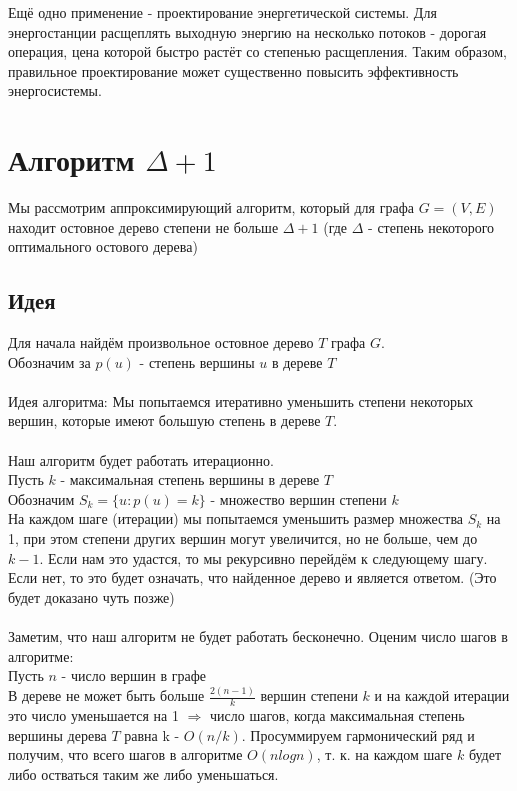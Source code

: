 \documentclass[a4paper, 12pt]{article}
\begin{document}
Ещё одно применение - проектирование энергетической системы. Для энергостанции расщеплять выходную энергию на несколько потоков - дорогая операция, цена которой быстро растёт со степенью расщепления. Таким образом, правильное проектирование может существенно повысить эффективность энергосистемы.

\section{Алгоритм $\Delta + 1$}

Мы рассмотрим аппроксимирующий алгоритм, который для графа $G = (V, E)$ находит остовное дерево степени не больше $\Delta + 1$ (где $\Delta$ - степень некоторого оптимального остового дерева)

\subsection{Идея}
Для начала найдём произвольное остовное дерево $T$ графа $G$.\\
Обозначим за $p(u)$ - степень вершины $u$ в дереве $T$\\
\\
Идея алгоритма: Мы попытаемся итеративно уменьшить степени некоторых вершин, которые имеют большую степень в дереве $T$.\\
\\
Наш алгоритм будет работать итерационно.\\
Пусть $k$ - максимальная степень вершины в дереве $T$\\
Обозначим $S_k = \{u : p(u) = k\}$ - множество вершин степени $k$\\
На каждом шаге (итерации) мы попытаемся уменьшить размер множества $S_k$ на 1, при этом степени других вершин могут увеличится, но не больше, чем до $k-1$. Если нам это удастся, то мы рекурсивно перейдём к следующему шагу. Если нет, то это будет означать, что найденное дерево и является ответом. (Это будет доказано чуть позже)\\
\\
Заметим, что наш алгоритм не будет работать бесконечно. Оценим число шагов в алгоритме:\\
Пусть $n$ - число вершин в графе\\
В дереве не может быть больше $\frac{2(n - 1)}{k}$ вершин степени $k$ и на каждой итерации это число уменьшается на 1 $\Rightarrow$ число шагов, когда максимальная степень вершины дерева $T$ равна k - $O(n / k)$. Просуммируем гармонический ряд и получим, что всего шагов в алгоритме $O(nlogn)$, т. к. на каждом шаге $k$ будет либо остваться таким же либо уменьшаться.\\
\\
\end{document}

